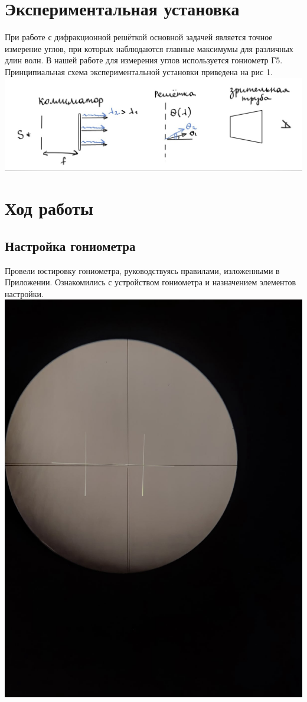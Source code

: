 \documentclass[a4paper]{article}
\begin{document}
\section{Экспериментальная установка}
	При работе с дифракционной решёткой основной задачей является точное измерение углов, при которых наблюдаются главные максимумы для различных длин волн. В нашей работе для измерения углов используется гониометр Г5. Принципиальная схема экспериментальной установки приведена на рис 1.\\
\includegraphics[width=15cm]{inst}\\
\section{Ход работы}
\subsection{ Настройка гониометра}
Провели юстировку гониометра, руководствуясь правилами, изложенными в Приложении. Ознакомились с устройством гониометра и назначением элементов настройки. \\
\includegraphics[width=15cm]{p2}\\
\end{document}
